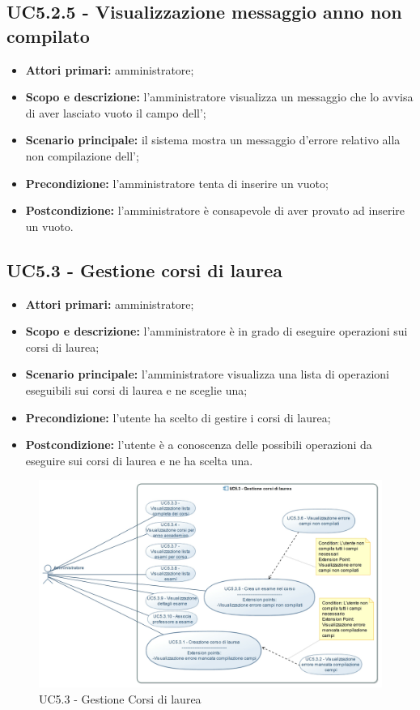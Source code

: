 \documentclass[AnalisiDeiRequisiti.tex]{subfiles}
\begin{document}
\subsection{UC5.2.5 - Visualizzazione messaggio anno non compilato}
\begin{itemize}
	\item \textbf{Attori primari:} amministratore;
	\item \textbf{Scopo e descrizione:} l'amministratore visualizza un messaggio che lo avvisa di aver lasciato vuoto il campo dell';
	\item \textbf{Scenario principale:} il sistema mostra un messaggio d'errore relativo alla non compilazione dell';
	\item \textbf{Precondizione:} l'amministratore tenta di inserire un  vuoto; 
	\item \textbf{Postcondizione:} l'amministratore è consapevole di aver provato ad inserire un  vuoto.
\end{itemize}
\subsection{UC5.3 - Gestione corsi di laurea}
\begin{itemize}
	\item \textbf{Attori primari:} amministratore;
	\item \textbf{Scopo e descrizione:} l'amministratore è in grado di eseguire operazioni sui corsi di laurea;
	\item \textbf{Scenario principale:} l'amministratore visualizza una lista di operazioni eseguibili sui corsi di laurea e ne sceglie una;
	\item \textbf{Precondizione:} l'utente ha scelto di gestire i corsi di laurea; 
	\item \textbf{Postcondizione:} l'utente è a conoscenza delle possibili operazioni da eseguire sui corsi di laurea e ne ha scelta una.
\end{itemize}

\begin{figure}[H]
	\centering
	\includegraphics[width=1.0\linewidth]{UC5_3.jpg}
	\caption{UC5.3 - Gestione Corsi di laurea}
	\label{fig:UC5.3 - Gestione Corsi di laurea}
\end{figure}
\end{document}
